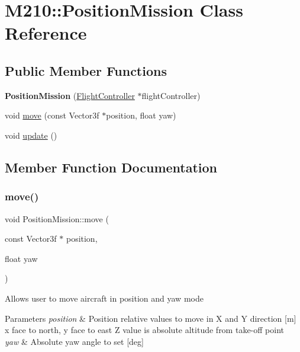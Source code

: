 \hypertarget{class_m210_1_1_position_mission}{}\section{M210\+:\+:Position\+Mission Class Reference}
\label{class_m210_1_1_position_mission}
\subsection*{Public Member Functions}
\begin{DoxyCompactItemize}
\item 
\mbox{\label{class_m210_1_1_position_mission_a3b3a2c4bb91fb6e01b73b0969a79a39a}} 
{\bfseries Position\+Mission} (\mbox{\hyperlink{class_m210_1_1_flight_controller}{Flight\+Controller}} $\ast$flight\+Controller)
\item 
void \mbox{\hyperlink{class_m210_1_1_position_mission_a683a572a71e0ace4b63748be39e2d6e8}{move}} (const Vector3f $\ast$position, float yaw)
\item 
void \mbox{\hyperlink{class_m210_1_1_position_mission_ab2f7cf5caff61d1f73df7253bcc097c6}{update}} ()
\end{DoxyCompactItemize}


\subsection{Member Function Documentation}
\mbox{\label{class_m210_1_1_position_mission_a683a572a71e0ace4b63748be39e2d6e8}} 
\subsubsection{\texorpdfstring{move()}{move()}}
{\footnotesize\ttfamily void Position\+Mission\+::move (\begin{DoxyParamCaption}\item[{const Vector3f $\ast$}]{position,  }\item[{float}]{yaw }\end{DoxyParamCaption})}

Allows user to move aircraft in position and yaw mode 
\begin{DoxyParams}{Parameters}
{\em position} & Position relative values to move in X and Y direction \mbox{[}m\mbox{]} x face to north, y face to east Z value is absolute altitude from take-\/off point \\
\hline
{\em yaw} & Absolute yaw angle to set \mbox{[}deg\mbox{]} \\
\hline
\end{DoxyParams}
\mbox{\label{class_m210_1_1_position_mission_ab2f7cf5caff61d1f73df7253bcc097c6}} 
